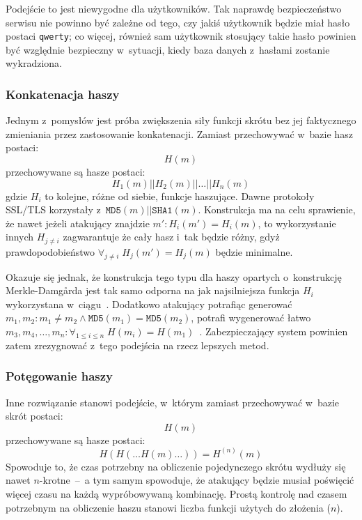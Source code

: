 Podejście to jest niewygodne dla użytkowników. Tak naprawdę bezpieczeństwo
serwisu nie powinno być zależne od tego, czy jakiś użytkownik będzie miał hasło
postaci \texttt{qwerty}; co więcej, również sam użytkownik stosujący takie
hasło powinien być względnie bezpieczny w~sytuacji, kiedy baza danych
z~hasłami zostanie wykradziona.

\subsubsection{Konkatenacja haszy}

Jednym z~pomysłów jest próba zwiększenia siły funkcji skrótu bez jej
faktycznego zmieniania przez zastosowanie konkatenacji. Zamiast przechowywać
w~bazie hasz postaci:
    $$H(m)$$
przechowywane są hasze postaci:
    $$H_1(m)||H_2(m)||\ldots||H_n(m)$$
gdzie $H_i$ to kolejne, różne od siebie, funkcje haszujące. Dawne protokoły
SSL/TLS korzystały z~$\mathtt{MD5}(m)||\mathtt{SHA1}(m)$. Konstrukcja ma na
celu sprawienie, że nawet jeżeli atakujący znajdzie $m' : H_i(m') = H_i(m)$, to
wykorzystanie innych $H_{j \neq i}$ zagwarantuje że cały hasz i~tak będzie
różny, gdyż prawdopodobieństwo $\forall_{j \neq i} \; H_j(m') = H_j(m)$ będzie
minimalne.

Okazuje się jednak, że konstrukcja tego typu dla haszy opartych o~konstrukcję
Merkle-Damg\r{a}rda jest tak samo odporna na  jak
najsilniejsza funkcja $H_i$ wykorzystana w~ciągu~\cite{md5_concatenation}.
Dodatkowo atakujący potrafiąc generować $m_1, m_2 : m_1 \neq m_2 \wedge
\mathtt{MD5}(m_1) = \mathtt{MD5}(m_2)$, potrafi wygenerować łatwo $m_3, m_4,
\ldots, m_n : \forall_{1 \leq i \leq n} \; H(m_i) =
H(m_1)$~\cite{md5_multi_collision_attack}. Zabezpieczający system powinien
zatem zrezygnować z~tego podejścia na rzecz lepszych metod.

\subsubsection{Potęgowanie haszy}

Inne rozwiązanie stanowi podejście, w~którym zamiast przechowywać w~bazie skrót
postaci:
    $$H(m)$$
przechowywane są hasze postaci:
    $$H(H(\ldots H(m) \ldots)) = H^{(n)}(m)$$
Spowoduje to, że czas potrzebny na obliczenie pojedynczego skrótu wydłuży się
nawet $n$-krotne~--~a tym samym spowoduje, że atakujący będzie musiał poświęcić
więcej czasu na każdą wypróbowywaną kombinację. Prostą kontrolę nad czasem
potrzebnym na obliczenie haszu stanowi liczba funkcji użytych do złożenia
($n$).

